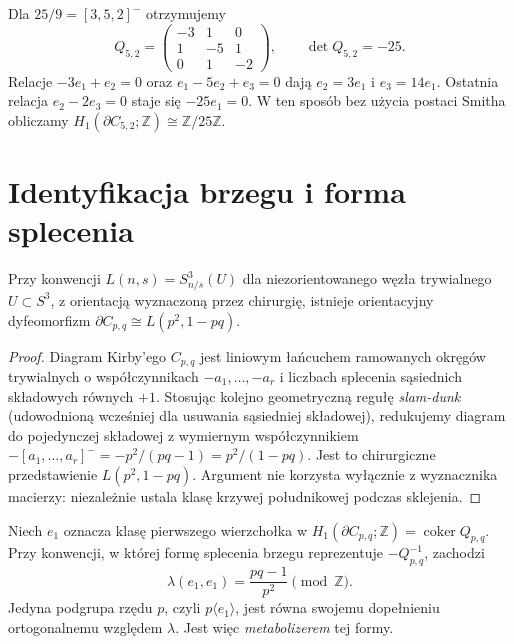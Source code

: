 \begin{przyklad}
Dla $25/9=[3,5,2]^-$ otrzymujemy
\[
Q_{5,2}=\begin{pmatrix}-3&1&0\\1&-5&1\\0&1&-2\end{pmatrix},
\qquad\det Q_{5,2}=-25.
\]
Relacje $-3e_1+e_2=0$ oraz
$e_1-5e_2+e_3=0$ dają $e_2=3e_1$ i $e_3=14e_1$.
Ostatnia relacja $e_2-2e_3=0$ staje się
$-25e_1=0$. W ten sposób bez użycia postaci Smitha
obliczamy $H_1(\partial C_{5,2};\mathbb Z)\cong\mathbb Z/25\mathbb Z$.
\end{przyklad}

\section{Identyfikacja brzegu i forma splecenia}
\label{sec:tg-general-boundary}

\begin{twierdzenie}
\label{thm:tg-general-lens}
Przy konwencji $L(n,s)=S^3_{n/s}(U)$ dla
niezorientowanego węzła trywialnego $U\subset S^3$,
z orientacją wyznaczoną przez chirurgię, istnieje
orientacyjny dyfeomorfizm
$\partial C_{p,q}\cong L(p^2,1-pq)$.
\end{twierdzenie}

\begin{proof}
Diagram Kirby'ego $C_{p,q}$ jest liniowym łańcuchem
ramowanych okręgów trywialnych o współczynnikach
$-a_1,\ldots,-a_r$ i liczbach splecenia sąsiednich
składowych równych $+1$.
Stosując kolejno geometryczną regułę \emph{slam-dunk}
(udowodnioną wcześniej dla usuwania sąsiedniej składowej),
redukujemy diagram do pojedynczej składowej z wymiernym
współczynnikiem
$-[a_1,\ldots,a_r]^-= -p^2/(pq-1)=p^2/(1-pq)$.
Jest to chirurgiczne przedstawienie $L(p^2,1-pq)$.
Argument nie korzysta wyłącznie z wyznacznika macierzy:
niezależnie ustala klasę krzywej południkowej podczas sklejenia.
\end{proof}

\begin{stwierdzenie}
\label{prop:tg-general-linking}
Niech $e_1$ oznacza klasę pierwszego wierzchołka w
$H_1(\partial C_{p,q};\mathbb Z)=\operatorname{coker}Q_{p,q}$.
Przy konwencji, w której formę splecenia brzegu reprezentuje
$-Q_{p,q}^{-1}$, zachodzi
\[
\lambda(e_1,e_1)=\frac{pq-1}{p^2}\pmod{\mathbb Z}.
\]
Jedyna podgrupa rzędu $p$, czyli $p\langle e_1\rangle$,
jest równa swojemu dopełnieniu ortogonalnemu względem
$\lambda$. Jest więc \emph{metabolizerem} tej formy.
\end{stwierdzenie}

